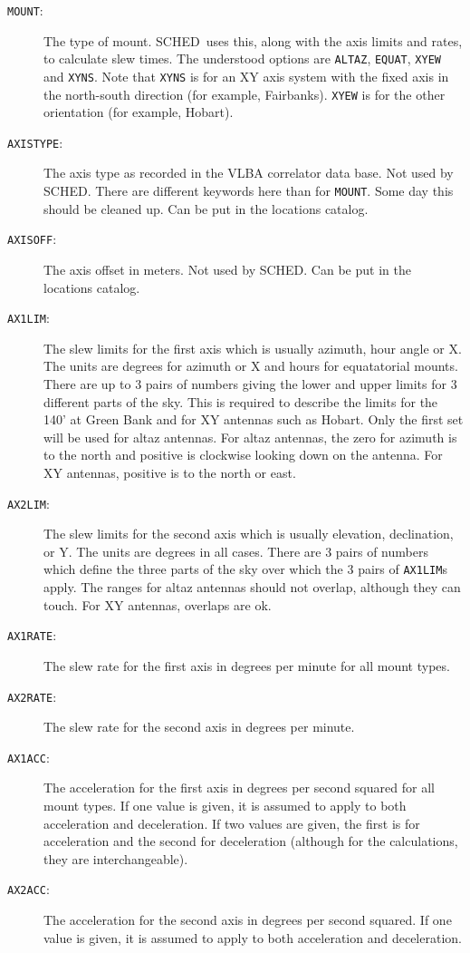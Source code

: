 \documentclass{report}
\newcommand{\sched}{{\sc SCHED}}
\newcommand{\schedb}{{\sc SCHED~}}
\begin{document}
\begin{description}

\item[{\tt MOUNT}:] The type of mount.  \schedb uses this, along with
the axis limits and rates, to calculate slew times.  The understood
options are {\tt ALTAZ}, {\tt EQUAT}, {\tt XYEW} and {\tt XYNS}.  Note
that {\tt XYNS} is for an XY axis system with the fixed axis in the
north-south direction (for example, Fairbanks).  {\tt XYEW}
is for the other orientation (for example, Hobart).

\item[{\tt AXISTYPE}:] The axis type as recorded in the VLBA
correlator data base.  Not used by \sched.  There are different
keywords here than for {\tt MOUNT}.  Some day this should be cleaned
up.  Can be put in the locations catalog.

\item[{\tt AXISOFF}:] The axis offset in meters.  Not used by \sched.
Can be put in the locations catalog.

\item [{\tt AX1LIM}:] The slew limits for the first axis which is
usually azimuth, hour angle or X.  The units are degrees for azimuth
or X and hours for equatatorial mounts.  There are up to 3 pairs of
numbers giving the lower and upper limits for 3 different parts of the
sky.  This is required to describe the limits for the 140' at Green
Bank and for XY antennas such as Hobart.  Only the first set will be
used for altaz antennas.  For altaz antennas, the zero for azimuth is
to the north and positive is clockwise looking down on the antenna.
For XY antennas, positive is to the north or east.

\item [{\tt AX2LIM}:] The slew limits for the second axis which is
usually elevation, declination, or Y.  The units are degrees in all
cases.  There are 3 pairs of numbers which define the three parts
of the sky over which the 3 pairs of {\tt AX1LIM}s apply.  The ranges
for altaz antennas should not overlap, although they can touch.  For
XY antennas, overlaps are ok.

\item [{\tt AX1RATE}:] The slew rate for the first axis in degrees
per minute for all mount types.

\item [{\tt AX2RATE}:] The slew rate for the second axis in degrees
per minute.

\item [{\tt AX1ACC}:] The acceleration for the first axis in degrees
per second squared for all mount types.  If one value is given, it is
assumed to apply to both acceleration and deceleration.  If two
values are given, the first is for acceleration and the second for
deceleration (although for the calculations, they are interchangeable).

\item [{\tt AX2ACC}:] The acceleration for the second axis in degrees
per second squared.  If one value is given, it is
assumed to apply to both acceleration and deceleration.

\end{description}
\end{document}

